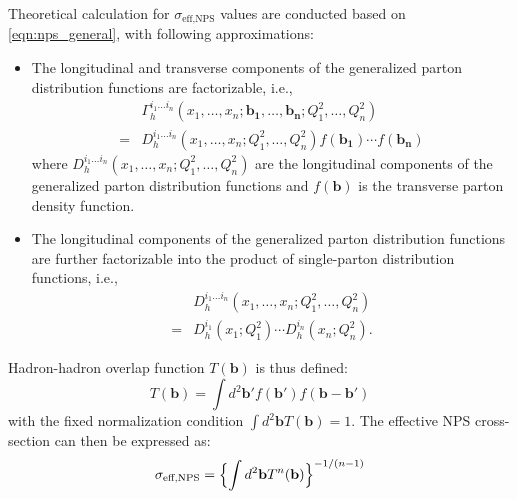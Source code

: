 \documentclass[10pt,twocolumn]{article}
\newcommand*{\effXsecNPS}{\sigma_{\text{eff,NPS}}}
\begin{document}
Theoretical calculation for $\effXsecNPS$ values are conducted based on \ref{eqn:nps_general}, with following approximations:
\begin{itemize}
    \item The longitudinal and transverse components of the generalized parton distribution functions are factorizable, i.e.,
    \begin{equation}
        \label{eqn:parton_transverse_factorization}
        \begin{aligned}
            &
            \Gamma_h^{i_1\dots i_n}(x_1,\dots,x_n;\mathbf{b_1},\dots,\mathbf{b_n};Q_1^2,\dots,Q_n^2)
             \\
            =
            & D_h^{i_1\dots i_n}(x_1,\dots,x_n;Q_1^2,\dots,Q_n^2) f(\mathbf{b_1})\cdots f(\mathbf{b_n})
        \end{aligned}
    \end{equation}
    where $D_h^{i_1\dots i_n}(x_1,\dots,x_n;Q_1^2,\dots,Q_n^2)$ are the longitudinal components of the generalized parton distribution functions and $f(\mathbf{b})$ is the transverse parton density function.
    \item The longitudinal components of the generalized parton distribution functions are further factorizable into the product of single-parton distribution functions, i.e.,
    \begin{equation}
        \label{eqn:parton_longitudinal_factorization}
        \begin{aligned}
            &
            D_h^{i_1\dots i_n}(x_1,\dots,x_n;Q_1^2,\dots,Q_n^2)
            \\
            =
            &
            D_h^{i_1}(x_1;Q_1^2)\cdots D_h^{i_n}(x_n;Q_n^2).
        \end{aligned}
    \end{equation}
\end{itemize}

Hadron-hadron overlap function $T(\mathbf{b})$ is thus defined:
\begin{equation}
    \label{eqn:hadron_overlap}
    T(\mathbf{b}) = \int d^2\mathbf{b'} f(\mathbf{b'}) f(\mathbf{b - b'})
\end{equation}
with the fixed normalization condition $\int d^2\mathbf{b} T(\mathbf{b}) = 1$. The effective NPS cross-section can then be expressed as:
\begin{equation}
    \label{eqn:nps_eff_xsec_from_overlap}
    \effXsecNPS = \Bigl\{ \int d^2\mathbf{b} T^n(\mathbf{b}) \Bigr\}^{-1/(n-1)}
\end{equation}
\end{document}
